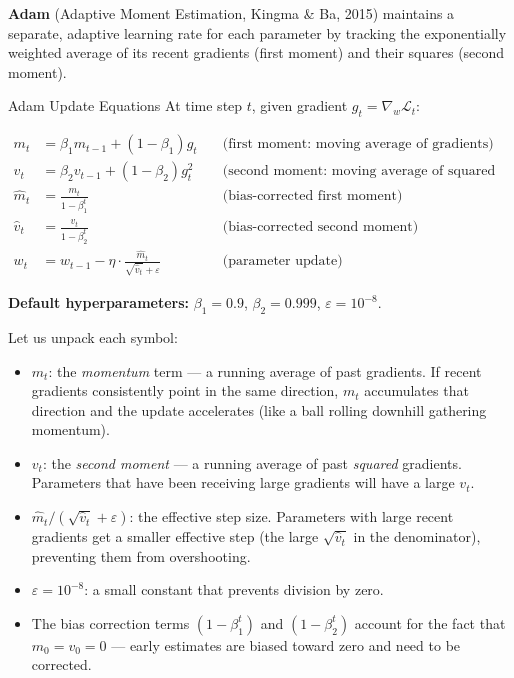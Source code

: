 \textbf{Adam} (Adaptive Moment Estimation, Kingma \& Ba, 2015) maintains a separate, adaptive learning rate for each parameter by tracking the exponentially weighted average of its recent gradients (first moment) and their squares (second moment).

\begin{mathbox}{Adam Update Equations}
At time step $t$, given gradient $g_t = \nabla_w \mathcal{L}_t$:

\begin{align}
    m_t &= \beta_1 m_{t-1} + (1 - \beta_1) g_t \quad & \text{(first moment: moving average of gradients)} \\
    v_t &= \beta_2 v_{t-1} + (1 - \beta_2) g_t^2 \quad & \text{(second moment: moving average of squared gradients)} \\
    \hat{m}_t &= \frac{m_t}{1 - \beta_1^t} \quad & \text{(bias-corrected first moment)} \\
    \hat{v}_t &= \frac{v_t}{1 - \beta_2^t} \quad & \text{(bias-corrected second moment)} \\
    w_t &= w_{t-1} - \eta \cdot \frac{\hat{m}_t}{\sqrt{\hat{v}_t} + \varepsilon} \quad & \text{(parameter update)}
\end{align}

\textbf{Default hyperparameters:} $\beta_1 = 0.9$, $\beta_2 = 0.999$, $\varepsilon = 10^{-8}$.
\end{mathbox}

Let us unpack each symbol:
\begin{itemize}
    \item $m_t$: the \emph{momentum} term --- a running average of past gradients. If recent gradients consistently point in the same direction, $m_t$ accumulates that direction and the update accelerates (like a ball rolling downhill gathering momentum).
    \item $v_t$: the \emph{second moment} --- a running average of past \emph{squared} gradients. Parameters that have been receiving large gradients will have a large $v_t$.
    \item $\hat{m}_t / (\sqrt{\hat{v}_t} + \varepsilon)$: the effective step size. Parameters with large recent gradients get a smaller effective step (the large $\sqrt{\hat{v}_t}$ in the denominator), preventing them from overshooting.
    \item $\varepsilon = 10^{-8}$: a small constant that prevents division by zero.
    \item The bias correction terms $(1 - \beta_1^t)$ and $(1 - \beta_2^t)$ account for the fact that $m_0 = v_0 = 0$ --- early estimates are biased toward zero and need to be corrected.
\end{itemize}

